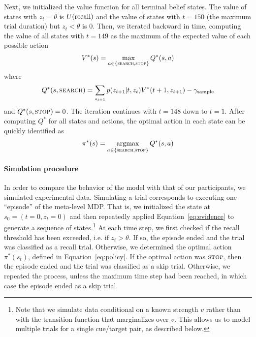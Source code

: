 Next, we initialized the value function for all terminal belief states. The value of states with $z_t = \theta$ is $U({\text{recall}})$ and the value of states with $t=150$ (the maximum trial duration) but $z_t < \theta$ is 0. Then, we iterated backward in time, computing the value of all states with $t=149$ as the maximum of the expected value of each possible action
%
\begin{equation}
\begin{aligned}
  V^*(s) = \max_{a \in \{\textsc{search}, \textsc{stop}\}} Q^*(s, a) 
\end{aligned}
\end{equation}
where
%
\begin{equation}
  Q^*(s, \textsc{search}) = \sum_{z_{t+1}} p(z_{t+1} | t, z_t) V^*(t+1, z_{t+1}) - \gamma_\text{sample}
\end{equation}
%
and $Q^*(s, \textsc{stop}) = 0$. The iteration continues with $t=148$ down to $t=1$. After computing $Q^*$ for all states and actions, the optimal action in each state can be quickly identified as
%
\begin{equation}
  \pi^*(s) = \operatorname*{argmax}_{a \in \{\textsc{search}, \textsc{stop}\}} Q^*(s, a) 
\end{equation}
%

\paragraph{Simulation procedure}
In order to compare the behavior of the model with that of our participants, we simulated experimental data. Simulating a trial corresponds to executing one ``episode'' of the meta-level MDP. That is, we initialized the state at $s_0 = (t=0, z_t = 0)$ and then repeatedly applied Equation~\ref{eq:evidence} to generate a sequence of states.\footnote{Note that we simulate data conditional on a known strength $v$ rather than with the transition function that marginalizes over $v$. This allows us to model multiple trials for a single cue/target pair, as described below.} At each time step, we first checked if the recall threshold has been exceeded, i.e. if $z_t > \theta$. If so, the episode ended and the trial was classified as a recall trial. Otherwise, we determined the optimal action $\pi^*(s_t)$, defined in Equation~\ref{eq:policy}. If the optimal action was $\textsc{stop}$, then the episode ended and the trial was classified as a skip trial. Otherwise, we repeated the process, unless the maximum time step had been reached, in which case the episode ended as a skip trial.

